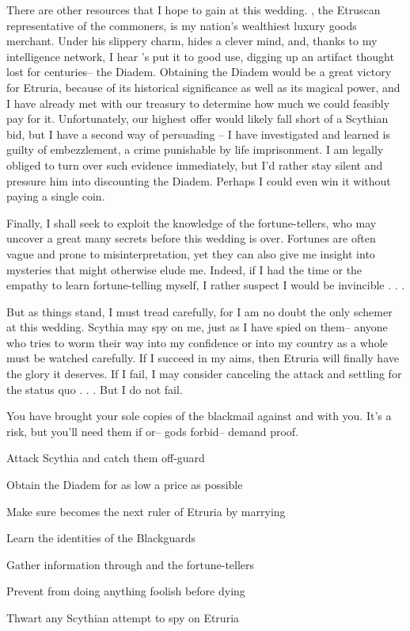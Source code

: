 \documentclass[char]{Kos}
\begin{document}
There are other resources that I hope to gain at this wedding. \cMerchant{}, the Etruscan representative of the commoners, is my nation's wealthiest luxury goods merchant. Under his slippery charm, \cMerchant{\they} hides a clever mind, and, thanks to my intelligence network, I hear \cMerchant{\they}'s put it to good use, digging up an artifact thought lost for centuries-- the Diadem. Obtaining the Diadem would be a great victory for Etruria, because of its historical significance as well as its magical power, and I have already met with our treasury to determine how much we could feasibly pay for it. Unfortunately, our highest offer would likely fall short of a Scythian bid, but I have a second way of persuading \cMerchant{}-- I have investigated \cMerchant{\them} and learned \cMerchant{\they} is guilty of embezzlement, a crime punishable by life imprisonment. I am legally obliged to turn over such evidence immediately, but I'd rather stay silent and pressure him into discounting the Diadem. Perhaps I could even win it without paying a single coin.

Finally, I shall seek to exploit the knowledge of the fortune-tellers, who may uncover a great many secrets before this wedding is over. Fortunes are often vague and prone to misinterpretation, yet they can also give me insight into mysteries that might otherwise elude me. Indeed, if I had the time or the empathy to learn fortune-telling myself, I rather suspect I would be invincible . . .

But as things stand, I must tread carefully, for I am no doubt the only schemer at this wedding. Scythia may spy on me, just as I have spied on them-- anyone who tries to worm their way into my confidence or into my country as a whole must be watched carefully. If I succeed in my aims, then Etruria will finally have the glory it deserves. If I fail, I may consider canceling the attack and settling for the status quo . . . But I do not fail.

\begin{itemz}[Notes]
  \item You have brought your sole copies of the blackmail against \cBride{} and \cMerchant{} with you. It's a risk, but you'll need them if \cMerchant{} or-- gods forbid-- \cBride{} demand proof.
\end{itemz}

\begin{itemz}[Goals]
 \item Attack Scythia and catch them off-guard
 \item Obtain the Diadem for as low a price as possible
 \item Make sure \cBride{} becomes the next ruler of Etruria by marrying \cGroom{}
 \item Learn the identities of the Blackguards
 \item Gather information through \cBride{} and the fortune-tellers
 \item Prevent \cPoet{} from doing anything foolish before dying
 \item Thwart any Scythian attempt to spy on Etruria
\end{itemz}
\end{document}
